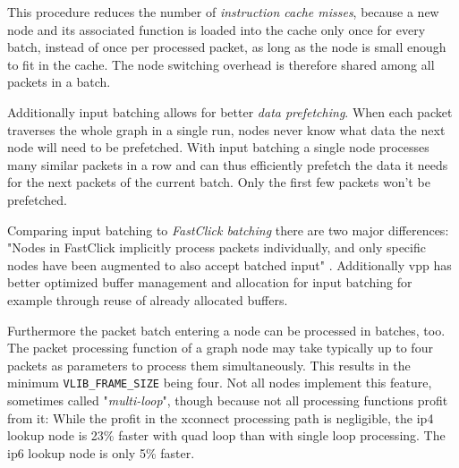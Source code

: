 This procedure reduces the number of \textit{instruction cache misses}, because
a new node and its associated function is loaded into the cache only
once for every batch, instead of once per processed packet, as long as
the node is small enough to fit in the cache. The node switching
overhead is therefore shared among all packets in a batch.

Additionally input batching allows for better \textit{data prefetching}. When
each packet traverses the whole graph in a single run, nodes never
know what data the next node will need to be prefetched. With input
batching a single node processes many similar packets in a row and can
thus efficiently prefetch the data it needs for the next packets of
the current batch. Only the first few packets won't be prefetched.

Comparing input batching to \textit{FastClick batching} there are two major
differences: "Nodes in FastClick implicitly process packets
individually, and only specific nodes have been augmented to also
accept batched input" \cite{linguaglossa2017high}. Additionally
\Ac{vpp} has better optimized buffer management and allocation for
input batching for example through reuse of already allocated buffers.
\cite{linguaglossa2017high}

Furthermore the packet batch entering a node can be processed in
batches, too. The packet processing function of a graph node may take
typically up to four packets as parameters to process them
simultaneously. This results in the minimum
\lstinline|VLIB_FRAME_SIZE| being four. Not all nodes implement this
feature, sometimes called "\textit{multi-loop}", though because not
all processing functions profit from it: While the profit in the
xconnect processing path is negligible, the \Ac{ip4} lookup node is
23\% faster with quad loop than with single loop processing. The
\Ac{ip6} lookup node is only 5\% faster. \cite{linguaglossa2017high}



